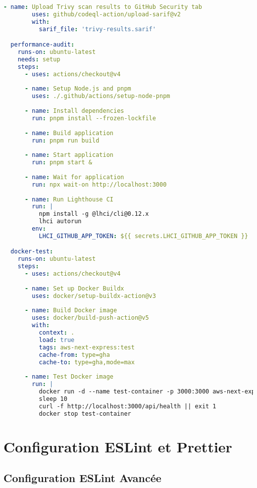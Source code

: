 \begin{lstlisting}[language=YAML, caption=.github/workflows/test-pipeline.yml]
      - name: Upload Trivy scan results to GitHub Security tab
        uses: github/codeql-action/upload-sarif@v2
        with:
          sarif_file: 'trivy-results.sarif'

  performance-audit:
    runs-on: ubuntu-latest
    needs: setup
    steps:
      - uses: actions/checkout@v4
      
      - name: Setup Node.js and pnpm
        uses: ./.github/actions/setup-node-pnpm
        
      - name: Install dependencies
        run: pnpm install --frozen-lockfile
        
      - name: Build application
        run: pnpm run build
        
      - name: Start application
        run: pnpm start &
        
      - name: Wait for application
        run: npx wait-on http://localhost:3000
        
      - name: Run Lighthouse CI
        run: |
          npm install -g @lhci/cli@0.12.x
          lhci autorun
        env:
          LHCI_GITHUB_APP_TOKEN: ${{ secrets.LHCI_GITHUB_APP_TOKEN }}

  docker-test:
    runs-on: ubuntu-latest
    steps:
      - uses: actions/checkout@v4
      
      - name: Set up Docker Buildx
        uses: docker/setup-buildx-action@v3
        
      - name: Build Docker image
        uses: docker/build-push-action@v5
        with:
          context: .
          load: true
          tags: aws-next-express:test
          cache-from: type=gha
          cache-to: type=gha,mode=max
          
      - name: Test Docker image
        run: |
          docker run -d --name test-container -p 3000:3000 aws-next-express:test
          sleep 10
          curl -f http://localhost:3000/api/health || exit 1
          docker stop test-container
\end{lstlisting}

\section{Configuration ESLint et Prettier}

\subsection{Configuration ESLint Avancée}


